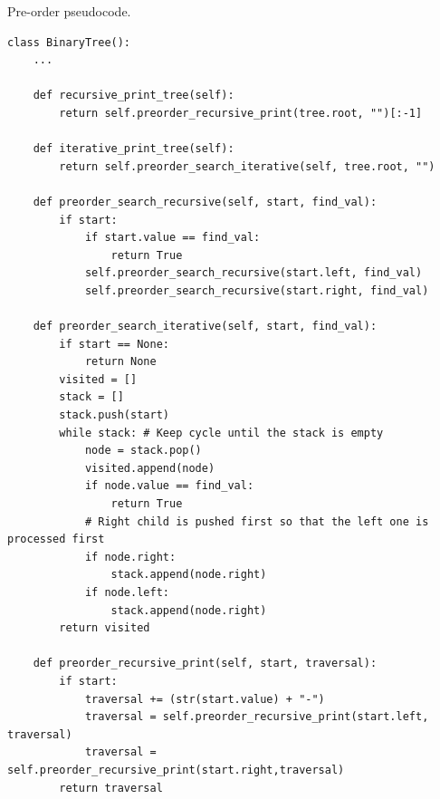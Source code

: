 \begin{algorithm}[H]
	\DontPrintSemicolon
	\LinesNumbered
  	\;
\caption{Pre-order pseudocode.}
\end{algorithm}

\begin{lstlisting}[firstnumber=1, caption={Recursive and iterative implementation of pre-order traversal.}]
class BinaryTree():
	...

	def recursive_print_tree(self):
		return self.preorder_recursive_print(tree.root, "")[:-1]
	
	def iterative_print_tree(self):
		return self.preorder_search_iterative(self, tree.root, "")

	def preorder_search_recursive(self, start, find_val):
		if start:
			if start.value == find_val:
				return True
			self.preorder_search_recursive(start.left, find_val)
			self.preorder_search_recursive(start.right, find_val)

	def preorder_search_iterative(self, start, find_val):
		if start == None:
			return None
		visited = []		
		stack = []
		stack.push(start)
		while stack: # Keep cycle until the stack is empty
			node = stack.pop()
			visited.append(node)
			if node.value == find_val:
				return True
			# Right child is pushed first so that the left one is processed first
			if node.right:
				stack.append(node.right)
			if node.left:
				stack.append(node.right)
		return visited

	def preorder_recursive_print(self, start, traversal):
		if start:
			traversal += (str(start.value) + "-")
			traversal = self.preorder_recursive_print(start.left, traversal)
			traversal = self.preorder_recursive_print(start.right,traversal)
		return traversal
\end{lstlisting}

